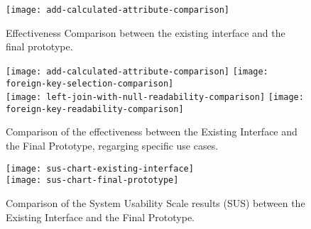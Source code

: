 \begin{figure}[htbp]
	\centering
	\texttt{[image: add-calculated-attribute-comparison]}
	\caption{Effectiveness Comparison between the existing interface and the final prototype.}
	\label{fig:addCalculatedAttributeComparison}
\end{figure}

\begin{figure}[tb]
    \centering
      {\texttt{[image: add-calculated-attribute-comparison]}}%
    {\texttt{[image: foreign-key-selection-comparison]}}%
    \\
      {\texttt{[image: left-join-with-null-readability-comparison]}}%
    {\texttt{[image: foreign-key-readability-comparison]}}%
    \caption{Comparison of the effectiveness between the Existing Interface and the Final Prototype, regarging specific use cases.}
    \label{fig:specificComparisons}
  \end{figure}

\begin{figure}[tb]
    \centering
      {\texttt{[image: sus-chart-existing-interface]}}%
      \\
    {\texttt{[image: sus-chart-final-prototype]}}%
  \caption{Comparison of the System Usability Scale results (SUS) between the Existing Interface and the Final Prototype.}
    \label{fig:susChartComparison}
  \end{figure}

